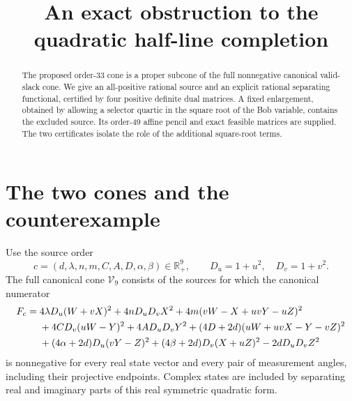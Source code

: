 \documentclass[10pt]{article}
\title{An exact obstruction to the quadratic half-line completion}
\author{}
\date{}
\newcommand{\R}{\mathbb R}
\newcommand{\V}{\mathcal V_9}
\begin{document}
\maketitle
\vspace{-2.5em}
\begin{abstract}
The proposed order-33 cone is a proper subcone of the full nonnegative
canonical valid-slack cone. We give an all-positive rational source and an
explicit rational separating functional, certified by four positive definite
dual matrices. A fixed enlargement, obtained by allowing a selector quartic
in the square root of the Bob variable, contains the excluded source. Its
order-49 affine pencil and exact feasible matrices are supplied. The two certificates isolate the role of the additional square-root terms.
\end{abstract}

\section{The two cones and the counterexample}
Use the source order
\[
c=(d,\lambda,n,m,C,A,D,\alpha,\beta)\in\R_+^9,
\qquad D_u=1+u^2,\quad D_v=1+v^2.
\]
The full canonical cone $\V$ consists of the sources for which the canonical numerator
\begin{align}
F_c={}&4\lambda D_u(W+vX)^2+4nD_uD_vX^2
 +4m(vW-X+uvY-uZ)^2\notag\\
&+4CD_v(uW-Y)^2+4AD_uD_vY^2
 +(4D+2d)(uW+uvX-Y-vZ)^2\notag\\
&+(4\alpha+2d)D_u(vY-Z)^2
 +(4\beta+2d)D_v(X+uZ)^2-2dD_uD_vZ^2                       \label{eq:F}
\end{align}
is nonnegative for every real state vector and every pair of measurement
angles, including their projective endpoints. Complex states are included
by separating real and imaginary parts of this real symmetric quadratic form.
\end{document}
